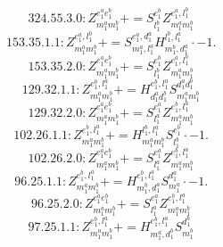 \documentclass[letterpaper,10pt,fleqn,leqno,onecolumn]{article}
\begin{document}
\begin{equation} \;\;\;\;\;\;  324.55.3.0: Z^{e_{1}^{a}e_{1}^{b}}_{m_{1}^{a}m_{1}^{b}}+=S^{e_{1}^{b}}_{l_{1}^{b}}Z^{e_{1}^{a},l_{1}^{b}}_{m_{1}^{a}m_{1}^{b}} \end{equation}
\begin{equation} \;\;\;\;\;\;  153.35.1.1: Z^{e_{1}^{a},l_{1}^{b}}_{m_{1}^{a}m_{1}^{b}}+=S^{e_{1}^{a},d_{1}^{a}}_{m_{1}^{a},l_{1}^{a}}H^{l_{1}^{b},l_{1}^{a}}_{m_{1}^{b},d_{1}^{a}}\cdot -1. \end{equation}
\begin{equation} \;\;\;\;\;\;  153.35.2.0: Z^{e_{1}^{a}e_{1}^{b}}_{m_{1}^{a}m_{1}^{b}}+=S^{e_{1}^{b}}_{l_{1}^{b}}Z^{e_{1}^{a},l_{1}^{b}}_{m_{1}^{a}m_{1}^{b}} \end{equation}
\begin{equation} \;\;\;\;\;\;  129.32.1.1: Z^{e_{1}^{b},l_{1}^{a}}_{m_{1}^{a}m_{1}^{b}}+=H^{e_{1}^{b},l_{1}^{a}}_{d_{1}^{a}d_{1}^{b}}S^{d_{1}^{a}d_{1}^{b}}_{m_{1}^{a}m_{1}^{b}} \end{equation}
\begin{equation} \;\;\;\;\;\;  129.32.2.0: Z^{e_{1}^{a}e_{1}^{b}}_{m_{1}^{a}m_{1}^{b}}+=S^{e_{1}^{a}}_{l_{1}^{a}}Z^{e_{1}^{b},l_{1}^{a}}_{m_{1}^{a}m_{1}^{b}} \end{equation}
\begin{equation} \;\;\;\;\;\;  102.26.1.1: Z^{e_{1}^{b},l_{1}^{a}}_{m_{1}^{a}m_{1}^{b}}+=H^{l_{1}^{b},l_{1}^{a}}_{m_{1}^{a}m_{1}^{b}}S^{e_{1}^{b}}_{l_{1}^{b}}\cdot -1. \end{equation}
\begin{equation} \;\;\;\;\;\;  102.26.2.0: Z^{e_{1}^{a}e_{1}^{b}}_{m_{1}^{a}m_{1}^{b}}+=S^{e_{1}^{a}}_{l_{1}^{a}}Z^{e_{1}^{b},l_{1}^{a}}_{m_{1}^{a}m_{1}^{b}} \end{equation}
\begin{equation} \;\;\;\;\;\;  96.25.1.1: Z^{e_{1}^{b},l_{1}^{a}}_{m_{1}^{a}m_{1}^{b}}+=H^{e_{1}^{b},l_{1}^{a}}_{m_{1}^{b},d_{1}^{a}}S^{d_{1}^{a}}_{m_{1}^{a}}\cdot -1. \end{equation}
\begin{equation} \;\;\;\;\;\;  96.25.2.0: Z^{e_{1}^{a}e_{1}^{b}}_{m_{1}^{a}m_{1}^{b}}+=S^{e_{1}^{a}}_{l_{1}^{a}}Z^{e_{1}^{b},l_{1}^{a}}_{m_{1}^{a}m_{1}^{b}} \end{equation}
\begin{equation} \;\;\;\;\;\;  97.25.1.1: Z^{e_{1}^{b},l_{1}^{a}}_{m_{1}^{a}m_{1}^{b}}+=H^{e_{1}^{b},l_{1}^{a}}_{m_{1}^{a},d_{1}^{b}}S^{d_{1}^{b}}_{m_{1}^{b}} \end{equation}
\end{document}
